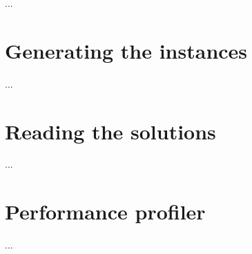 ...
\section{Generating the instances}
...
\section{Reading the solutions}
...
\section{Performance profiler}
...